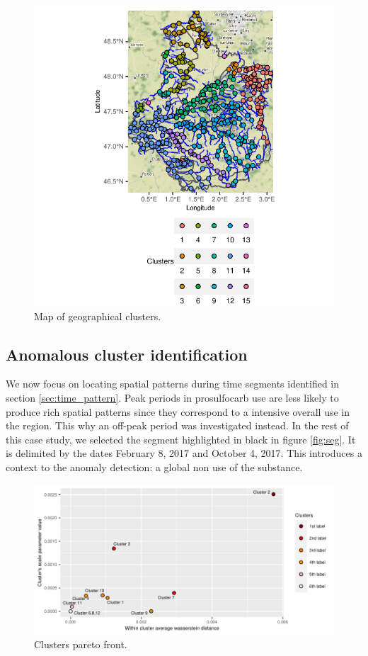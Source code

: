 \begin{figure}[ht]
  \centering
  \includegraphics[]{figs/Chap5/Graph_clust.pdf}
  \caption{Map of geographical clusters.}
  \label{fig:clust}
\end{figure}

\subsection{Anomalous cluster identification}\label{subsection:anomalous}

We now focus on locating spatial patterns during time segments identified in section \ref{sec:time_pattern}. Peak periods in prosulfocarb use are less likely to produce rich spatial patterns since they correspond to a intensive overall use in the region. This why an off-peak period was investigated instead. In the rest of this case study, we selected the segment highlighted in black in figure \ref{fig:seg}. It is delimited by the dates February 8, 2017 and October 4, 2017. This introduces a context to the anomaly detection: a global non use of the substance. 

\begin{figure}[ht]
  \centering
  \includegraphics[]{figs/Chap5/Pareto_plot.pdf}
  \caption{Clusters pareto front.}
  \label{fig:pareto:plot}
\end{figure}

